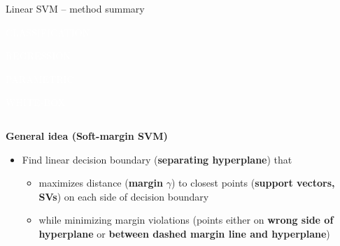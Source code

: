 \documentclass[11pt,compress,t,notes=noshow, xcolor=table]{beamer}
\newcommand{\highlight}[1]{\textcolor{hlcol}{\textbf{#1}}}
\newcommand{\maketag}[2][100]{
  \colorbox{hlcol!#1}{\textcolor{white}{\MakeUppercase{\scriptsize #2}} 
  \vphantom{}}
}
\begin{document}
\begin{frame2}{Linear SVM -- method summary}
  \maketag{CLASSIFICATION} \maketag[50]{REGRESSION} \maketag{PARAMETRIC} 
\maketag{WHITE-BOX} 
\medskip



\begin{columns}[T]
\begin{column}{0.7\linewidth}
\highlight{General idea (Soft-margin SVM)}
\begin{itemize}
\item Find linear decision boundary (\textbf{separating hyperplane}) that 
\begin{itemize}
  \item maximizes distance (\textbf{margin} $\gamma$) to closest points (\textbf{support vectors, SVs}) on each side of decision boundary
  \item while minimizing margin violations (points either on \textbf{wrong side of hyperplane} or \textbf{between dashed margin line and hyperplane})
\end{itemize}

\end{itemize}



\end{column}

\begin{column}{0.3\linewidth}
  

\end{column}
\end{columns}
\end{frame2}
\end{document}
